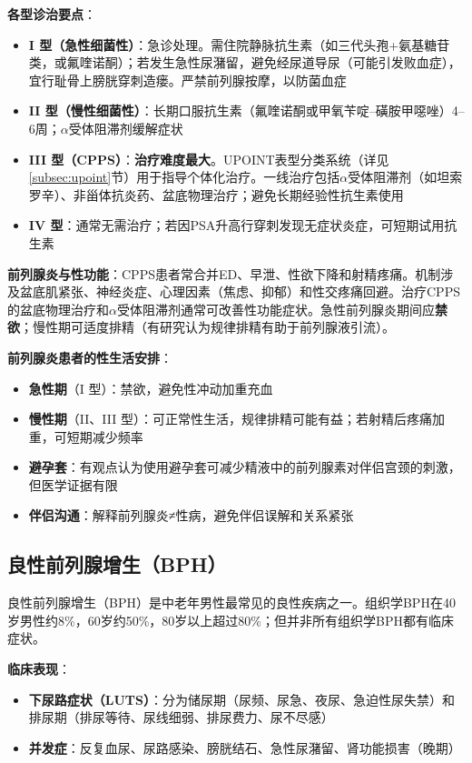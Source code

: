 \textbf{各型诊治要点}：

\begin{itemize}[leftmargin=2cm]
	\item \textbf{I 型（急性细菌性）}：急诊处理。需住院静脉抗生素（如三代头孢+氨基糖苷类，或氟喹诺酮）；若发生急性尿潴留，避免经尿道导尿（可能引发败血症），宜行耻骨上膀胱穿刺造瘘。严禁前列腺按摩，以防菌血症
	\item \textbf{II 型（慢性细菌性）}：长期口服抗生素（氟喹诺酮或甲氧苄啶--磺胺甲噁唑）4--6周；$\alpha$受体阻滞剂缓解症状
	\item \textbf{III 型（CPPS）}：\textbf{治疗难度最大}。UPOINT表型分类系统（详见\ref{subsec:upoint}节）用于指导个体化治疗。一线治疗包括$\alpha$受体阻滞剂（如坦索罗辛）、非甾体抗炎药、盆底物理治疗；避免长期经验性抗生素使用
	\item \textbf{IV 型}：通常无需治疗；若因PSA升高行穿刺发现无症状炎症，可短期试用抗生素
\end{itemize}

\textbf{前列腺炎与性功能}：CPPS患者常合并ED、早泄、性欲下降和射精疼痛。机制涉及盆底肌紧张、神经炎症、心理因素（焦虑、抑郁）和性交疼痛回避。治疗CPPS的盆底物理治疗和$\alpha$受体阻滞剂通常可改善性功能症状。急性前列腺炎期间应\textbf{禁欲}；慢性期可适度排精（有研究认为规律排精有助于前列腺液引流）。

\textbf{前列腺炎患者的性生活安排}：
\begin{itemize}[leftmargin=2cm]
	\item \textbf{急性期}（I 型）：禁欲，避免性冲动加重充血
	\item \textbf{慢性期}（II、III 型）：可正常性生活，规律排精可能有益；若射精后疼痛加重，可短期减少频率
	\item \textbf{避孕套}：有观点认为使用避孕套可减少精液中的前列腺素对伴侣宫颈的刺激，但医学证据有限
	\item \textbf{伴侣沟通}：解释前列腺炎≠性病，避免伴侣误解和关系紧张
\end{itemize}

\subsection{良性前列腺增生（BPH）}

良性前列腺增生（BPH）是中老年男性最常见的良性疾病之一。组织学BPH在40岁男性约8\%，60岁约50\%，80岁以上超过80\%；但并非所有组织学BPH都有临床症状。

\textbf{临床表现}：
\begin{itemize}[leftmargin=2cm]
	\item \textbf{下尿路症状（LUTS）}：分为储尿期（尿频、尿急、夜尿、急迫性尿失禁）和排尿期（排尿等待、尿线细弱、排尿费力、尿不尽感）
	\item \textbf{并发症}：反复血尿、尿路感染、膀胱结石、急性尿潴留、肾功能损害（晚期）
\end{itemize}

